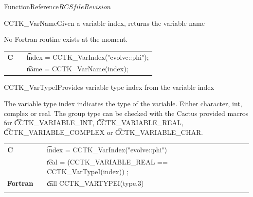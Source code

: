 \begin{cactuspart}{FunctionReference}{$RCSfile$}{$Revision$}
\begin{CCTKFunc}{CCTK\_VarName}{Given a variable index, returns the variable name}
\label{CCTK-VarName}
\showcargs
\begin{params}
\end{params}
\begin{discussion}
No Fortran routine exists at the moment.
\end{discussion}
\begin{examples}
\begin{tabular}{@{}p{3cm}cp{11cm}}
\hfill {\bf C} && {\t index = CCTK\_VarIndex("evolve::phi");}\\
               && {\t name = CCTK\_VarName(index);}
\\
\end{tabular}
\end{examples}
\begin{errorcodes}
\end{errorcodes}
\end{CCTKFunc}


\begin{CCTKFunc}{CCTK\_VarTypeI}{Provides variable type index from the variable index}
\label{CCTK-VarTypeI}
\showargs
\begin{params}
\end{params}
\begin{discussion}
The variable type index indicates the type of the variable.
Either character, int, complex or real. The group type can be checked
with the Cactus provided macros for {\t CCTK\_VARIABLE\_INT}, {\t CCTK\_VARIABLE\_REAL}, {\t CCTK\_VARIABLE\_COMPLEX} or {\t CCTK\_VARIABLE\_CHAR}.
\end{discussion}
\begin{examples}
\begin{tabular}{@{}p{3cm}cp{11cm}}
\hfill {\bf C} && {\t index = CCTK\_VarIndex("evolve::phi")}\\
               &&{\t real = (CCTK\_VARIABLE\_REAL == CCTK\_VarTypeI(index)) ;}
\\
\hfill {\bf Fortran} && {\t call CCTK\_VARTYPEI(type,3)}\\
\\
\end{tabular}
\end{examples}
\begin{errorcodes}
\end{errorcodes}
\end{CCTKFunc}


\end{cactuspart}
